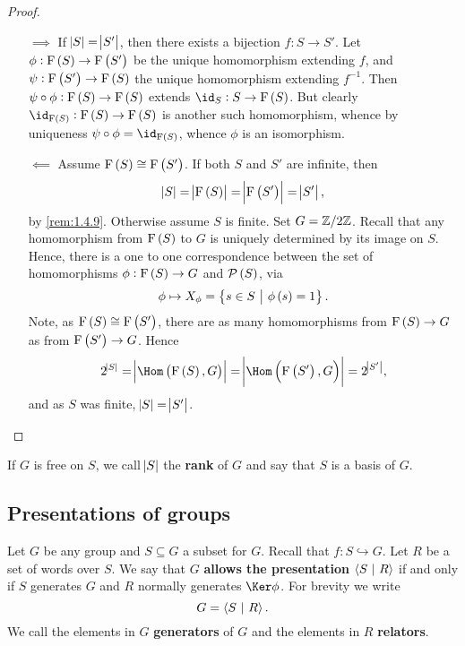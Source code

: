 \begin{proof}
\hfill
\begin{itemize}
\item[$ \implies $] If $ \abs{S} = \abs{S'} $, then there exists a bijection $ f : S \to S' $. Let $ \phi : \F\br{S} \to \F\br{S'} $ be the unique homomorphism extending $ f $, and $ \psi : \F\br{S'} \to \F\br{S} $ the unique homomorphism extending $ f^{-1} $. Then $ \psi \circ \phi : \F\br{S} \to \F\br{S} $ extends $ \id_S : S \to \F\br{S} $. But clearly $ \id_{\F\br{S}} : \F\br{S} \to \F\br{S} $ is another such homomorphism, whence by uniqueness $ \psi \circ \phi = \id_{\F\br{S}} $, whence $ \phi $ is an isomorphism.
\item[$ \impliedby $] Assume $ \F\br{S} \cong \F\br{S'} $. If both $ S $ and $ S' $ are infinite, then
$$ \abs{S} = \abs{\F\br{S}} = \abs{\F\br{S'}} = \abs{S'}, $$
by \ref{rem:1.4.9}. Otherwise assume $ S $ is finite. Set $ G = \mathbb{Z} / 2\mathbb{Z} $. Recall that any homomorphism from $ \F\br{S} $ to $ G $ is uniquely determined by its image on $ S $. Hence, there is a one to one correspondence between the set of homomorphisms $ \phi : \F\br{S} \to G $ and $ \PPP\br{S} $, via
$$ \phi \mapsto X_\phi = \cbr{s \in S \st \phi\br{s} = 1}. $$
Note, as $ \F\br{S} \cong \F\br{S'} $, there are as many homomorphisms from $ \F\br{S} \to G $ as from $ \F\br{S'} \to G $. Hence
$$ 2^{\abs{S}} = \abs{\Hom\br{\F\br{S}, G}} = \abs{\Hom\br{\F\br{S'}, G}} = 2^{\abs{S'}}, $$
and as $ S $ was finite, $ \abs{S} = \abs{S'} $.
\end{itemize}
\end{proof}

\begin{definition}
If $ G $ is free on $ S $, we call $ \abs{S} $ the \textbf{rank} of $ G $ and say that $ S $ is a basis of $ G $.
\end{definition}

\pagebreak

\subsection{Presentations of groups}

\begin{definition}
Let $ G $ be any group and $ S \subseteq G $ a subset for $ G $. Recall that $ f : S \hookrightarrow G $. Let $ R $ be a set of words over $ S $. We say that $ G $ \textbf{allows the presentation} $ \left\langle S \ \middle| \  R \right\rangle $ if and only if $ S $ generates $ G $ and $ R $ normally generates $ \Ker \phi $. For brevity we write
$$ G = \left\langle S \ \middle| \  R \right\rangle. $$
We call the elements in $ G $ \textbf{generators} of $ G $ and the elements in $ R $ \textbf{relators}.
\end{definition}


